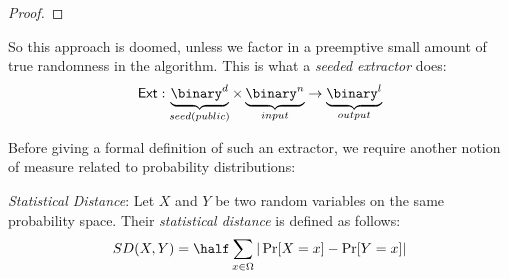 \begin{proof}

\end{proof}

So this approach is doomed, unless we factor in a preemptive small amount of true randomness in the algorithm. This is what a \emph{seeded extractor} does:
\[
    \ext: \underbrace{\binary^d}_{seed(public)}\times \underbrace{\binary^n}_{input} \to \underbrace{\binary^l}_{output}
\]

Before giving a formal definition of such an extractor, we require another notion of measure related to probability distributions:

\begin{definition} \emph{Statistical Distance}:
    Let $X$ and $Y$ be two random variables on the same probability space. Their \emph{statistical distance} is defined as follows:
    \[
        SD(X, Y) = \half\sum_{x \in \Omega}|\Pr[X = x] - \Pr[Y = x]|
    \]

\end{definition}

